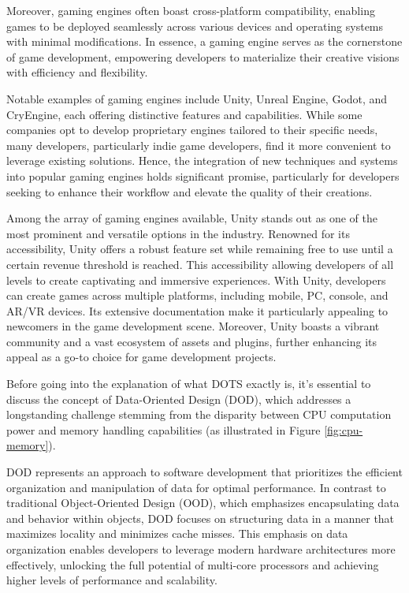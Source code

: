 Moreover, gaming engines often boast cross-platform compatibility, enabling games to be deployed seamlessly across various devices and operating systems with minimal modifications. In essence, a gaming engine serves as the cornerstone of game development, empowering developers to materialize their creative visions with efficiency and flexibility.

Notable examples of gaming engines include Unity, Unreal Engine, Godot, and CryEngine, \cite{Game_engines_comparison} each offering distinctive features and capabilities. While some companies opt to develop proprietary engines tailored to their specific needs, many developers, particularly indie game developers, find it more convenient to leverage existing solutions. Hence, the integration of new techniques and systems into popular gaming engines holds significant promise, particularly for developers seeking to enhance their workflow and elevate the quality of their creations.\newline

Among the array of gaming engines available, Unity stands out as one of the most prominent and versatile options in the industry. Renowned for its accessibility, Unity offers a robust feature set while remaining free to use until a certain revenue threshold is reached. This accessibility allowing developers of all levels to create captivating and immersive experiences. With Unity, developers can create games across multiple platforms, including mobile, PC, console, and AR/VR devices. Its extensive documentation make it particularly appealing to newcomers in the game development scene. Moreover, Unity boasts a vibrant community and a vast ecosystem of assets and plugins, further enhancing its appeal as a go-to choice for game development projects.\newline

Before going into the explanation of what DOTS exactly is, it's essential to discuss the concept of Data-Oriented Design (DOD), which addresses a longstanding challenge stemming from the disparity between CPU computation power and memory handling capabilities (as illustrated in Figure \ref{fig:cpu-memory}).

DOD represents an approach to software development that prioritizes the efficient organization and manipulation of data for optimal performance. In contrast to traditional Object-Oriented Design (OOD), which emphasizes encapsulating data and behavior within objects, DOD focuses on structuring data in a manner that maximizes locality and minimizes cache misses. This emphasis on data organization enables developers to leverage modern hardware architectures more effectively, unlocking the full potential of multi-core processors and achieving higher levels of performance and scalability.

